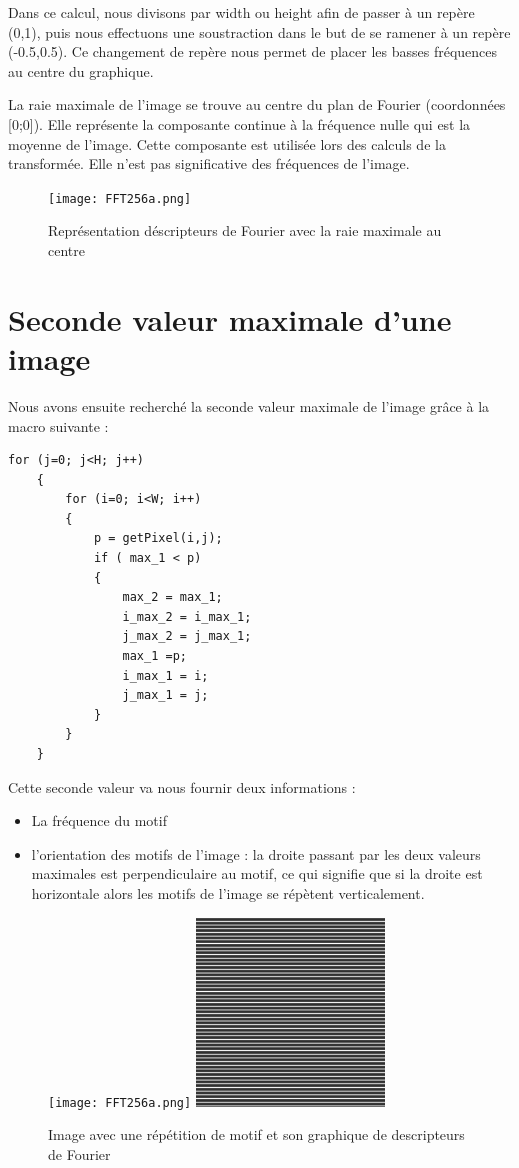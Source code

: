 \documentclass[a4paper,11pt]{article}
\begin{document}
  Dans ce calcul, nous divisons par width ou height afin de passer à un repère (0,1), puis nous effectuons une 
  soustraction dans le but de se ramener à un repère (-0.5,0.5). Ce changement de repère nous permet de placer
  les basses fréquences au centre du graphique.
  
  La raie maximale de l'image se trouve au centre du plan de Fourier (coordonnées [0;0]). Elle représente la 
  composante continue à la fréquence nulle qui est la moyenne de l'image. Cette composante est utilisée lors des
  calculs de la transformée. Elle n'est pas significative des fréquences de l'image.
  
  \begin{figure}[H]
  \center
   \texttt{[image: FFT256a.png]}
   \caption{Représentation déscripteurs de Fourier avec la raie maximale au centre}
  \end{figure}

  
  \section{Seconde valeur maximale d'une image}
  
  Nous avons ensuite recherché la seconde valeur maximale de l'image grâce à la macro suivante :
  \begin{lstlisting}[caption=Fonctions de recherche des deux maximales]
  for (j=0; j<H; j++)
    {
        for (i=0; i<W; i++) 
        {
            p = getPixel(i,j);
            if ( max_1 < p)
            {
                max_2 = max_1;
                i_max_2 = i_max_1;
                j_max_2 = j_max_1;
                max_1 =p;
                i_max_1 = i;
                j_max_1 = j;
            } 
        }
    }
  \end{lstlisting}
  
  Cette seconde valeur va nous fournir deux informations :
  \begin{itemize}
   \item La fréquence du motif
   \item l'orientation des motifs de l'image : la droite passant
  par les deux valeurs maximales est perpendiculaire au motif, ce qui signifie que si la droite est horizontale
  alors les motifs de l'image se répètent verticalement.
  \end{itemize}
  
  \begin{figure}[H]
  \center
   \texttt{[image: FFT256a.png]}
   \includegraphics[width=5cm]{256_a.jpg}
   \caption{Image avec une répétition de motif et son graphique de descripteurs de Fourier}
  \end{figure}
  
\end{document}
